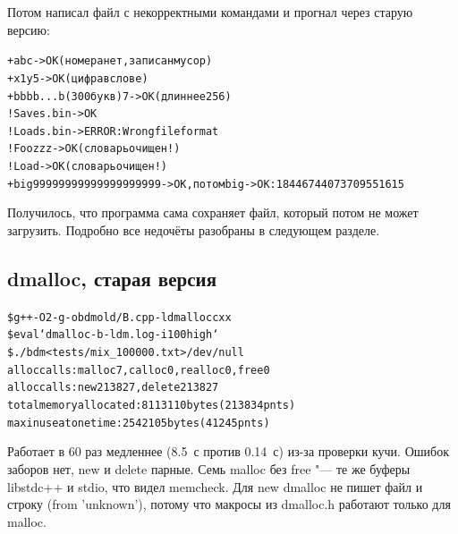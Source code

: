 Потом написал файл с некорректными командами и прогнал через старую версию:
\begin{alltt}
+ abc                         -> OK         (номера нет, записан мусор)
+ x1y 5                       -> OK         (цифра в слове)
+ bbbb...b (300 букв) 7       -> OK         (длиннее 256)
! Save s.bin                  -> OK
! Load s.bin                  -> ERROR: Wrong file format
! Foo zzz                     -> OK         (словарь очищен!)
! Load                        -> OK         (словарь очищен!)
+ big 99999999999999999999    -> OK, потом big -> OK: 18446744073709551615
\end{alltt}
Получилось, что программа сама сохраняет файл, который потом не может загрузить. Подробно все
недочёты разобраны в следующем разделе.

\subsection{dmalloc, старая версия}
\begin{alltt}
\$ g++ -O2 -g -o bdm old/B.cpp -ldmalloccxx
\$ eval `dmalloc -b -l dm.log -i 100 high`
\$ ./bdm < tests/mix_100000.txt > /dev/null
alloc calls: malloc 7, calloc 0, realloc 0, free 0
alloc calls: new 213827, delete 213827
 total memory allocated: 8113110 bytes (213834 pnts)
 max in use at one time: 2542105 bytes (41245 pnts)
\end{alltt}
Работает в 60 раз медленнее (8.5~с против 0.14~с) из-за проверки кучи. Ошибок заборов нет,
{\ttfamily new} и {\ttfamily delete} парные. Семь {\ttfamily malloc} без {\ttfamily free} "--- те же
буферы {\ttfamily libstdc++} и {\ttfamily stdio}, что видел {\ttfamily memcheck}. Для {\ttfamily new}
dmalloc не пишет файл и строку ({\ttfamily from 'unknown'}), потому что макросы из
{\ttfamily dmalloc.h} работают только для {\ttfamily malloc}.

